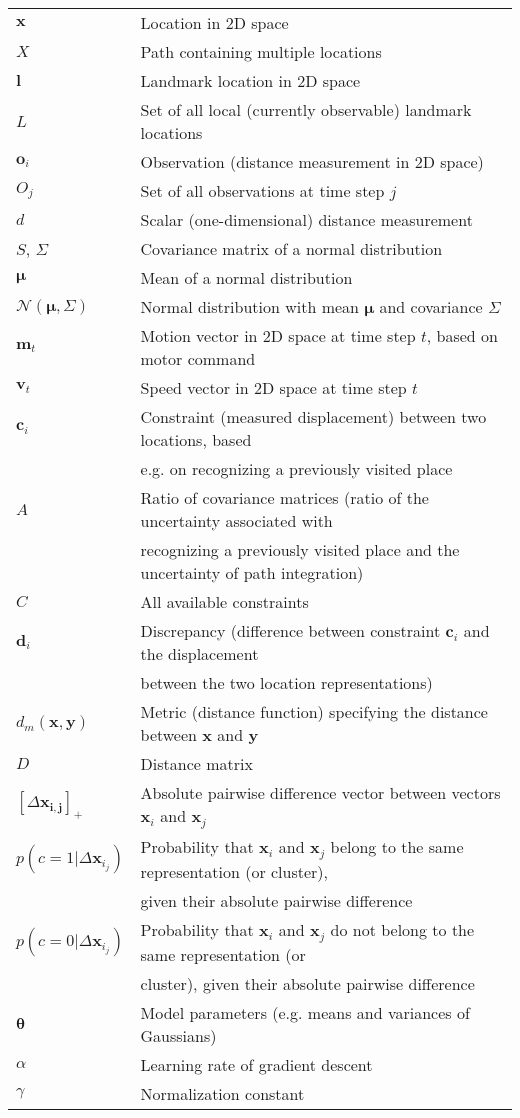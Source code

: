 

\begin{table*}[!htb]
\def\arraystretch{1.1}
\begin{tabular}{ll}
	$\bm x$ 		& Location in 2D space \\
	$X$ 			& Path containing multiple locations \\
	$\bm l$			& Landmark location in 2D space \\
	$L$				& Set of all local (currently observable) landmark locations \\
	$\bm o_i$		& Observation (distance measurement in 2D space) \\
	$O_j$			& Set of all observations at time step $j$ \\
	$d$				& Scalar (one-dimensional) distance measurement \\
	$S$, $\Sigma$	& Covariance matrix of a normal distribution \\
	$\bm \mu$			& Mean of a normal distribution \\
	$\mathcal{N}(\bm \mu, \Sigma)$ & Normal distribution with mean $\bm \mu$ and covariance $\Sigma$ \\
	$\bm m_t$		& Motion vector in 2D space at time step $t$, based on motor command \\
	$\bm v_t$		& Speed vector in 2D space at time step $t$\\
	$\bm c_i$		& Constraint (measured displacement) between two locations, based  \\
	& e.g. on recognizing a previously visited place \\
	$A$				& Ratio of covariance matrices (ratio of the uncertainty associated with  \\
	& recognizing a previously visited place and the uncertainty of path integration) \\
	$C$				& All available constraints \\
	$\bm d_i$		& Discrepancy (difference between constraint $\bm c_i$ and the displacement  \\
	& between the two location representations) \\
	$d_m(\bm x, \bm y)$	& Metric (distance function) specifying the distance between $\bm x$ and $\bm y$ \\
	$D$				& Distance matrix \\
	$[\Delta \bm{x_{i,j}}]_+$ & Absolute pairwise difference vector between vectors $\bm x_i$ and $\bm x_j$ \\
	$p(c=1|\Delta \bm x_{i_j})$ & Probability that $\bm x_i$ and $\bm x_j$ belong to the same representation (or cluster),   \\
	& given their absolute pairwise difference\\
	$p(c=0|\Delta \bm x_{i_j})$ & Probability that $\bm x_i$ and $\bm x_j$ do not belong to the same representation (or \\
	& cluster), given their absolute pairwise difference\\
	$\bm \theta$ 		& Model parameters (e.g. means and variances of Gaussians) \\
	$\alpha$			& Learning rate of gradient descent \\
	$\gamma$			& Normalization constant \\
	

\end{tabular}
\end{table*}
